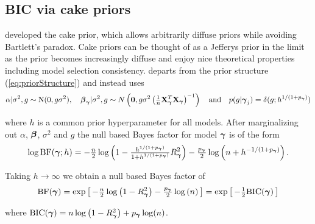 {\subsection{BIC via cake priors}  

\noindent
\cite{OrmerodEtal2017} developed the cake prior, which allows arbitrarily
diffuse priors while avoiding Bartlett's paradox.  Cake priors can be thought
of as a Jefferys prior in the limit as the prior becomes increasingly diffuse
and enjoy nice theoretical properties including model selection consistency.
\cite{OrmerodEtal2017} departs from the prior structure
(\ref{eq:priorStructure}) and instead uses
\begin{equation}\label{eq:proirs2}
	\displaystyle \alpha|\sigma^2,g \sim \text{N}(0,g\sigma^2), \quad 
	\displaystyle {\boldsymbol\beta}_{\boldsymbol \gamma}|\sigma^2,g \sim N\left( {\bf 0},g\sigma^2\left( \tfrac{1}{n}{\bf X}_{\boldsymbol \gamma}^T{\bf X}_{\boldsymbol \gamma}\right)^{-1}\right)
	\quad \mbox{and} \quad
	p(g|{\boldsymbol \gamma}_j) = \delta(g; h^{1/(1 + p_{\boldsymbol \gamma})})
\end{equation}

\noindent where $h$ is a common prior hyperparameter for all models. After
marginalizing out $\alpha$, ${\boldsymbol \beta}$, $\sigma^2$ and $g$ the null based Bayes
factor for model ${\boldsymbol \gamma}$ is of the form
$$
\begin{array}{rl}
\displaystyle \log\mbox{BF}({\boldsymbol \gamma};h)
=
-\tfrac{n}{2}\log\left( 1 - \tfrac{h^{1/(1+p_{\boldsymbol \gamma})}}{1+h^{1/(1+p_{\boldsymbol \gamma})}} R_{\boldsymbol \gamma}^2 \right) 
- \tfrac{p_{\boldsymbol \gamma}}{2}\log\left(n + h^{-1/(1+p_{\boldsymbol \gamma})} \right).
\end{array}
$$

\noindent Taking $h\to\infty$ we obtain a null based Bayes factor of
\begin{equation}\label{eq:marginalLikelihoodCake}
	\displaystyle \mbox{BF}({\boldsymbol \gamma})
	=
	\exp\left[ \,
	-\tfrac{n}{2}\log\left( 1 - R_{\boldsymbol \gamma}^2 \right) 
	- \tfrac{p_{\boldsymbol \gamma}}{2}\log\left(n \right) \,
	\right] = \exp\left[ \, -\tfrac{1}{2}\mbox{BIC}({\boldsymbol \gamma}) \,\right]
\end{equation}

\noindent where $\mbox{BIC}({\boldsymbol \gamma}) = n\log\left( 1 - R_{\boldsymbol \gamma}^2 \right) +
p_{\boldsymbol \gamma} \log(n)$. 

}

